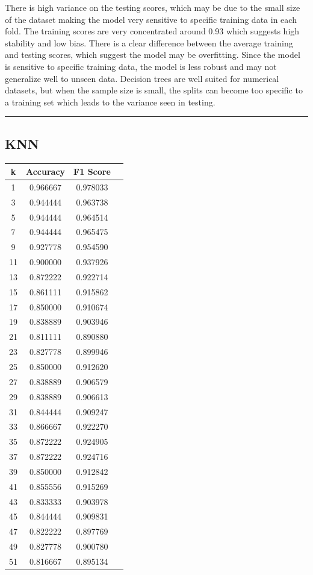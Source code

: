 \documentclass{article}
\begin{document}
There is high variance on the testing scores, which may be due to the small size of the dataset making the model
very sensitive to specific training data in each fold. 
The training scores are very concentrated around 0.93 which suggests high stability and low bias. 
There is a clear difference between the average training and testing scores, which suggest the model may be overfitting.
Since the model is sensitive to specific training data, the model is less robust and may not generalize well to unseen data.
Decision trees are well suited for numerical datasets, but when the sample size is small, the splits can become too specific
to a training set which leads to the variance seen in testing.

\noindent\rule{\textwidth}{0.5pt}

\subsection{KNN}

\begin{tabular}
{|c|c|c|c|}
\hline
k & Accuracy & F1 Score \\
\hline
1	& 0.966667	& 0.978033 \\
3	& 0.944444	& 0.963738 \\
5	& 0.944444	& 0.964514 \\
7	& 0.944444	& 0.965475 \\
9	& 0.927778	& 0.954590 \\
11	& 0.900000	& 0.937926 \\
13	& 0.872222	& 0.922714 \\
15	& 0.861111	& 0.915862 \\
17	& 0.850000	& 0.910674 \\
19	& 0.838889	& 0.903946 \\
21	& 0.811111	& 0.890880 \\
23	& 0.827778	& 0.899946 \\
25	& 0.850000	& 0.912620 \\
27	& 0.838889	& 0.906579 \\
29	& 0.838889	& 0.906613 \\
31	& 0.844444	& 0.909247 \\
33	& 0.866667	& 0.922270 \\
35	& 0.872222	& 0.924905 \\
37	& 0.872222	& 0.924716 \\
39	& 0.850000	& 0.912842 \\
41	& 0.855556	& 0.915269 \\
43	& 0.833333	& 0.903978 \\
45	& 0.844444	& 0.909831 \\
47	& 0.822222	& 0.897769 \\
49	& 0.827778	& 0.900780 \\
51	& 0.816667	& 0.895134 \\
\end{tabular}
\end{document}
